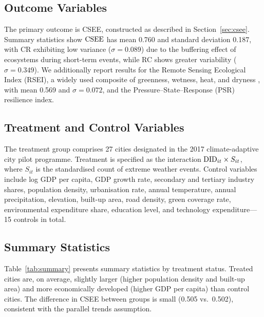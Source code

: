\subsection{Outcome Variables}

The primary outcome is CSEE, constructed as described in
Section~\ref{sec:csee}. Summary statistics show
$\mathrm{CSEE}$ has mean 0.760 and standard deviation 0.187, with CR exhibiting
low variance ($\sigma = 0.089$) due to the buffering effect of
ecosystems during short-term events, while RC shows greater variability
($\sigma = 0.349$). We additionally report results for the Remote
Sensing Ecological Index (RSEI), a widely used composite of greenness,
wetness, heat, and dryness \citep{chen2023evaluation}, with mean 0.569
and $\sigma = 0.072$, and the Pressure--State--Response (PSR) resilience
index.

\subsection{Treatment and Control Variables}

The treatment group comprises 27 cities designated in the 2017
climate-adaptive city pilot programme. Treatment is specified as the
interaction $\mathrm{DID}_{it} \times S_{it}$, where $S_{it}$ is the standardised
count of extreme weather events. Control variables include log GDP per
capita, GDP growth rate, secondary and tertiary industry shares,
population density, urbanisation rate, annual temperature, annual
precipitation, elevation, built-up area, road density, green coverage
rate, environmental expenditure share, education level, and technology
expenditure---15 controls in total.

\subsection{Summary Statistics}

Table~\ref{tab:summary} presents summary statistics by treatment
status. Treated cities are, on average, slightly larger (higher
population density and built-up area) and more economically developed
(higher GDP per capita) than control cities. The difference in CSEE
between groups is small (0.505 vs.\ 0.502), consistent with the parallel
trends assumption.

